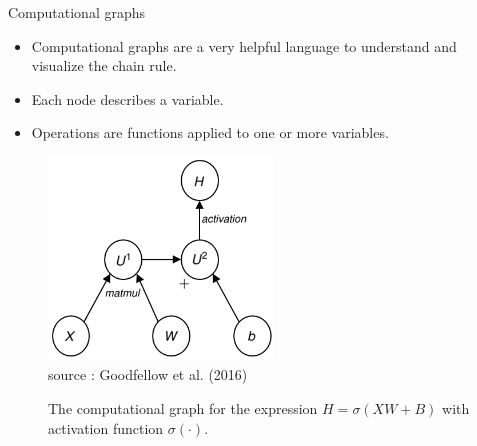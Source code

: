 \begin{vbframe}{Computational graphs}
  \begin{minipage}{0.45\textwidth}
    \begin{itemize}
      \item Computational graphs are a very helpful language to understand and visualize the chain rule.
      \item Each node describes a variable.
      \item Operations are functions applied to one or more variables.
    \end{itemize}
  \end{minipage}\hfill
  \begin{minipage}{0.5\textwidth}
    \begin{figure}
      \centering
        \includegraphics[width=6cm]{figure/compgraph1.png}
        \tiny{\\source : Goodfellow et al. (2016)}
        \caption{The computational graph for the expression $H = \sigma(XW + B)$ with activation function $\sigma(\cdot)$.}
    \end{figure}
  \end{minipage}  
\end{vbframe}

